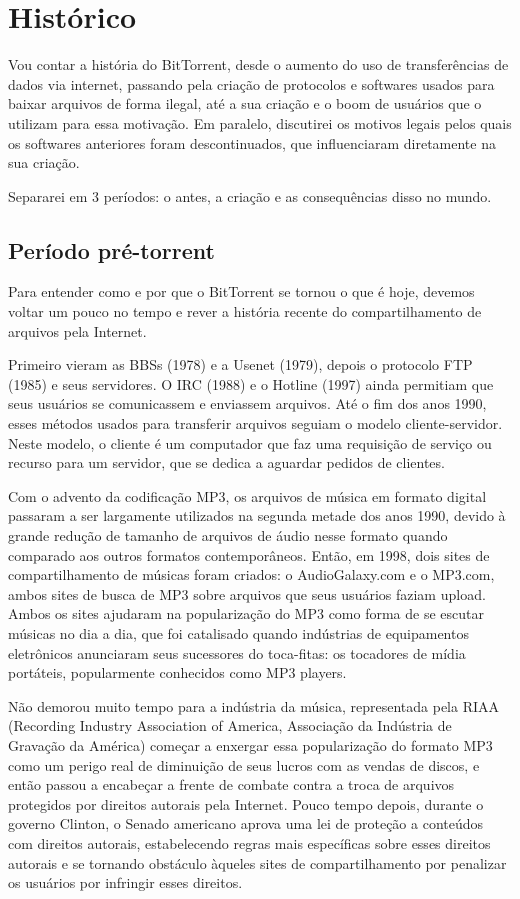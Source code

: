 
\chapter{Histórico}

Vou contar a história do BitTorrent, desde o aumento do uso de transferências de dados via internet, passando pela criação de protocolos e softwares usados para baixar arquivos de forma ilegal, até a sua criação e o boom de usuários que o utilizam para essa motivação. Em paralelo, discutirei os motivos legais pelos quais os softwares anteriores foram descontinuados, que influenciaram diretamente na sua criação.

Separarei em 3 períodos: o antes, a criação e as consequências disso no mundo.

\section{Período pré-torrent}

Para entender como e por que o BitTorrent se tornou o que é hoje, devemos voltar um pouco no tempo e rever a história recente do compartilhamento de arquivos pela Internet.

Primeiro vieram as BBSs (1978) e a Usenet (1979), depois o protocolo FTP (1985) e seus servidores. O IRC (1988) e o Hotline (1997) ainda permitiam que seus usuários se comunicassem e enviassem arquivos. Até o fim dos anos 1990, esses métodos usados para transferir arquivos seguiam o modelo cliente-servidor. Neste modelo, o cliente é um computador que faz uma requisição de serviço ou recurso para um servidor, que se dedica a aguardar pedidos de clientes.

Com o advento da codificação MP3, os arquivos de música em formato digital passaram a ser largamente utilizados na segunda metade dos anos 1990, devido à grande redução de tamanho de arquivos de áudio nesse formato quando comparado aos outros formatos contemporâneos. Então, em 1998, dois sites de compartilhamento de músicas foram criados: o AudioGalaxy.com e o MP3.com, ambos sites de busca de MP3 sobre arquivos que seus usuários faziam upload. Ambos os sites ajudaram na popularização do MP3 como forma de se escutar músicas no dia a dia, que foi catalisado quando indústrias de equipamentos eletrônicos anunciaram seus sucessores do toca-fitas: os tocadores de mídia portáteis, popularmente conhecidos como MP3 players.

Não demorou muito tempo para a indústria da música, representada pela RIAA (Recording Industry Association of America, Associação da Indústria de Gravação da América) começar a enxergar essa popularização do formato MP3 como um perigo real de diminuição de seus lucros com as vendas de discos, e então passou a encabeçar a frente de combate contra a troca de arquivos protegidos por direitos autorais pela Internet. Pouco tempo depois, durante o governo Clinton, o Senado americano aprova uma lei de proteção a conteúdos com direitos autorais, estabelecendo regras mais específicas sobre esses direitos autorais e se tornando obstáculo àqueles sites de compartilhamento por penalizar os usuários por infringir esses direitos.

